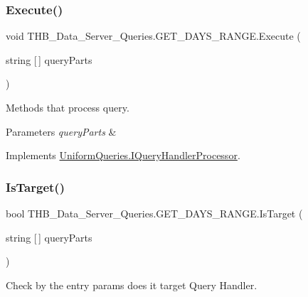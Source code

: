 \subsubsection{\texorpdfstring{Execute()}{Execute()}}
{\footnotesize\ttfamily void T\+H\+B\+\_\+\+Data\+\_\+\+Server\+\_\+\+Queries.\+G\+E\+T\+\_\+\+D\+A\+Y\+S\+\_\+\+R\+A\+N\+G\+E.\+Execute (\begin{DoxyParamCaption}\item[{string \mbox{[}$\,$\mbox{]}}]{query\+Parts }\end{DoxyParamCaption})}



Methods that process query. 


\begin{DoxyParams}{Parameters}
{\em query\+Parts} & \\
\hline
\end{DoxyParams}


Implements \mbox{\hyperlink{interface_uniform_queries_1_1_i_query_handler_processor_a60538b1b29c5d1d3bc67db28a265677a}{Uniform\+Queries.\+I\+Query\+Handler\+Processor}}.

\mbox{\label{class_t_h_b___data___server___queries_1_1_g_e_t___d_a_y_s___r_a_n_g_e_a2b21ca7e9599161544424cd0f7e55ef4}} 
\subsubsection{\texorpdfstring{Is\+Target()}{IsTarget()}}
{\footnotesize\ttfamily bool T\+H\+B\+\_\+\+Data\+\_\+\+Server\+\_\+\+Queries.\+G\+E\+T\+\_\+\+D\+A\+Y\+S\+\_\+\+R\+A\+N\+G\+E.\+Is\+Target (\begin{DoxyParamCaption}\item[{string \mbox{[}$\,$\mbox{]}}]{query\+Parts }\end{DoxyParamCaption})}



Check by the entry params does it target Query Handler. 


